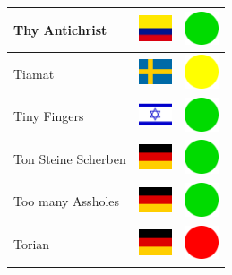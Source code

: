 \documentclass[12pt, a4paper, twoside]{report}
\begin{document}
\begin{center}
\begin{longtable}{|p{5cm}|p{2cm}|p{2cm}|}
 Thy Antichrist                                             & \includegraphics[width=1cm]{../4x3/co} &   \includegraphics[width=1cm]{../likes/y} \\ \hline
 Tiamat                                                     & \includegraphics[width=1cm]{../4x3/se} &   \includegraphics[width=1cm]{../likes/m} \\ \hline
 Tiny Fingers                                               & \includegraphics[width=1cm]{../4x3/il} &   \includegraphics[width=1cm]{../likes/y} \\ \hline
 Ton Steine Scherben                                        & \includegraphics[width=1cm]{../4x3/de} &   \includegraphics[width=1cm]{../likes/y} \\ \hline
 Too many Assholes                                          & \includegraphics[width=1cm]{../4x3/de} &   \includegraphics[width=1cm]{../likes/y} \\ \hline
 Torian                                                     & \includegraphics[width=1cm]{../4x3/de} &   \includegraphics[width=1cm]{../likes/n} \\ \hline

\end{longtable}
\end{center}
\end{document}
